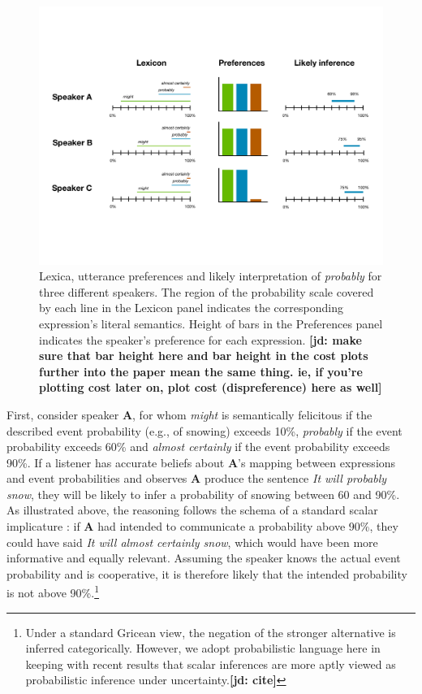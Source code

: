 \documentclass[lucida,biblatex]{sp} %
\newcommand{\jd}[1]{\textcolor{PinkyPurple}{\textbf{[jd: #1]}}}
\begin{document}
\begin{figure}
\center
\includegraphics[width=\textwidth]{plots/implicatures.pdf}
\caption{Lexica, utterance preferences and likely interpretation of \textit{probably} for three different speakers. The region of the probability scale covered by each line in the Lexicon panel indicates the corresponding expression's literal semantics. Height of bars in the Preferences panel indicates the speaker's preference for each expression.    \jd{make sure that bar height here and bar height in the cost plots further into the paper mean the same thing. ie, if you're plotting cost later on, plot cost (dispreference) here as well}}
\label{fig:inference-example}
\end{figure}

First, consider speaker {\bf A}, for whom \textit{might} is semantically felicitous if the described event probability (e.g., of snowing) exceeds 10\%, 
\textit{probably} if the event probability exceeds 60\% and \textit{almost certainly}  if the event probability exceeds 90\%.  If a listener has accurate beliefs about {\bf A}'s mapping between expressions and event probabilities and observes {\bf A}  produce the sentence \emph{It will probably snow}, they will be likely to infer a probability of snowing between 60 and 90\%. As illustrated above, the reasoning follows the schema of a standard scalar implicature \citep{Grice1975, Horn1984}: if  {\bf A} had intended to communicate a probability above 90\%, they could have said \emph{It will almost certainly snow}, which would have been more informative and equally relevant. Assuming the speaker knows the actual event probability and is cooperative, it is therefore likely that the intended probability is not above 90\%.\footnote{Under a standard Gricean view, the negation of the stronger alternative is inferred categorically. However, we adopt probabilistic language here in keeping with recent results that scalar inferences are more aptly viewed as probabilistic inference under uncertainty.\jd{cite}} 
\end{document}
